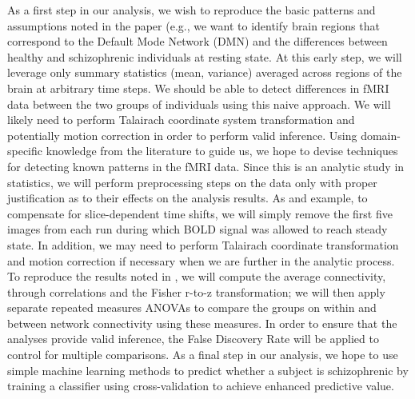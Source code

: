 \documentclass[11pt]{article}
\begin{document}
As a first step in our analysis, we wish to reproduce the basic patterns and assumptions 
noted in the paper (e.g., we want to identify brain regions that correspond to the Default 
Mode Network (DMN) and the differences between healthy and schizophrenic individuals 
at resting state. At this early step, we will leverage only summary statistics (mean, variance)
averaged across regions of the brain at arbitrary time steps. We should be able to detect 
differences in fMRI data between the two groups of individuals using this naive approach. 
We will likely need to perform Talairach coordinate system transformation and potentially
motion correction in order to perform valid inference. Using domain-specific knowledge 
from the literature to guide us, we hope to devise techniques for detecting known patterns 
in the fMRI data. Since this is an analytic study in statistics, we will perform preprocessing
steps on the data only with proper justification as to their effects on the analysis results. As
and example, to compensate for slice-dependent time shifts, we will simply remove the first
five images from each run during which BOLD signal was allowed to reach steady state. In
addition, we may need to perform Talairach coordinate transformation and motion correction
if necessary when we are further in the analytic process. To reproduce the results noted in
\cite{repovs2011}, we will compute the average connectivity, through correlations and the
Fisher r-to-z transformation; we will then apply separate repeated measures ANOVAs to 
compare the groups on within and between network connectivity using these measures. In
order to ensure that the analyses provide valid inference, the False Discovery Rate  will be
applied to control for multiple comparisons. As a final step in our analysis, we hope to use
simple machine learning methods to predict whether a subject is schizophrenic by training 
a classifier using cross-validation to achieve enhanced predictive value.



\end{document}

